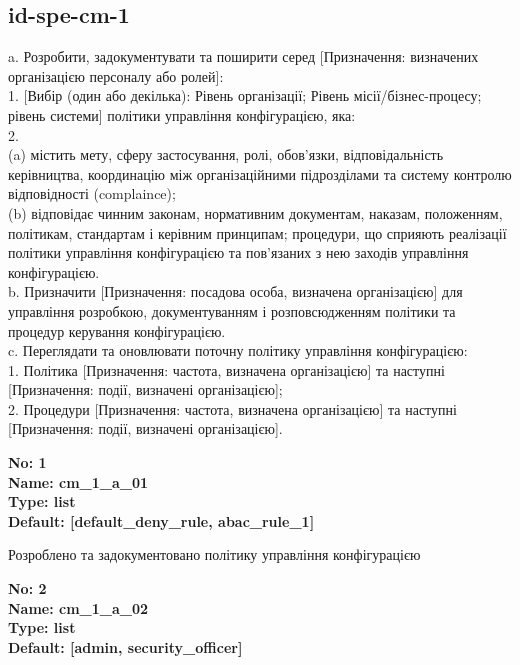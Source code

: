 \documentclass{article}
\begin{document}
\subsection{id-spe-cm-1}
a. Розробити, задокументувати та поширити серед [Призначення: визначених організацією персоналу або ролей]:\\ 
1. [Вибір (один або декілька): Рівень організації; Рівень місії/бізнес-процесу; рівень системи] політики управління конфігурацією, яка:\\ 
2.\\ 
(a) містить мету, сферу застосування, ролі, обов'язки, відповідальність керівництва, координацію між організаційними підрозділами та систему контролю відповідності (complaince);\\ 
(b) відповідає чинним законам, нормативним документам, наказам, положенням, політикам, стандартам і керівним принципам; процедури, що сприяють реалізації політики управління конфігурацією та пов'язаних з нею заходів управління конфігурацією.\\ 
b. Призначити [Призначення: посадова особа, визначена організацією] для управління розробкою, документуванням і розповсюдженням політики та процедур керування конфігурацією.\\ 
c. Переглядати та оновлювати поточну політику управління конфігурацією:\\ 
1. Політика [Призначення: частота, визначена організацією] та наступні [Призначення: події, визначені організацією];\\ 
2. Процедури [Призначення: частота, визначена організацією] та наступні [Призначення: події, визначені організацією].

\vspace{10pt}
{\footnotesize\bfseries
No: 1\\
Name: cm\_\allowbreak{}1\_\allowbreak{}a\_\allowbreak{}01\\
Type: list\\
Default: [\textquotedbl{}default\_\allowbreak{}deny\_\allowbreak{}rule\textquotedbl{}, \textquotedbl{}abac\_\allowbreak{}rule\_\allowbreak{}1\textquotedbl{}]
}

{\footnotesize Розроблено та задокументовано політику управління конфігурацією}


{\footnotesize\bfseries
No: 2\\
Name: cm\_\allowbreak{}1\_\allowbreak{}a\_\allowbreak{}02\\
Type: list\\
Default: [\textquotedbl{}admin\textquotedbl{}, \textquotedbl{}security\_\allowbreak{}officer\textquotedbl{}]
}
\end{document}
